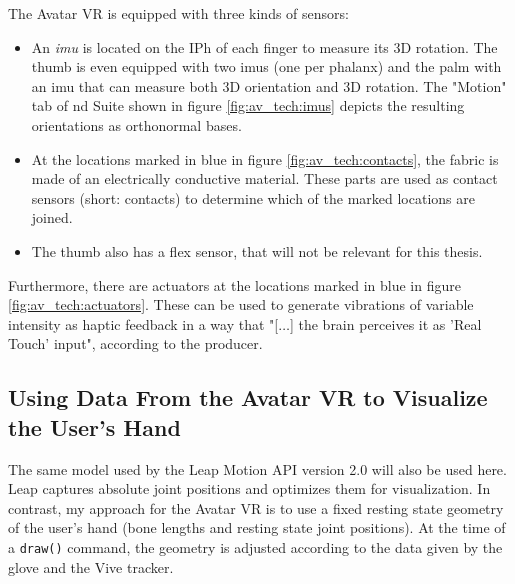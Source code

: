 \documentclass[hyperref, bachelorofscience]{cgvpub}
\begin{document}
The Avatar VR is equipped with three kinds of sensors: 
\begin{itemize}
	\item An \emph{\acrfull{imu}} is located on the \gls{IPh} of each finger to measure its 3D rotation. The thumb is even equipped with two \acrshort{imu}s (one per phalanx) and the palm with an \acrshort{imu} that can measure both 3D orientation and 3D rotation. The "Motion" tab of \acrshort{nd} Suite shown in figure \ref{fig:av_tech:imus} depicts the resulting orientations as orthonormal bases. 
	\item At the locations marked in blue in figure \ref{fig:av_tech:contacts}, the fabric is made of an electrically conductive material. These parts are used as contact sensors (short: contacts) to determine which of the marked locations are joined.
	\item The thumb also has a flex sensor, that will not be relevant for this thesis.
\end{itemize}

Furthermore, there are actuators at the locations marked in blue in figure \ref{fig:av_tech:actuators}. These can be used to generate vibrations of variable intensity as haptic feedback in a way that "[$\dots$] the brain perceives it as 'Real Touch' input", according to the producer.

\subsection{Using Data From the Avatar VR to Visualize the User's Hand}
The same model used by the Leap Motion API version 2.0 will also be used here. Leap captures absolute joint positions and optimizes them for visualization. In contrast, my approach for the Avatar VR is to use a fixed resting state geometry of the user's hand (bone lengths and resting state joint positions). At the time of a \lstinline|draw()| command, the geometry is adjusted according to the data given by the glove and the Vive tracker. 
\end{document}
